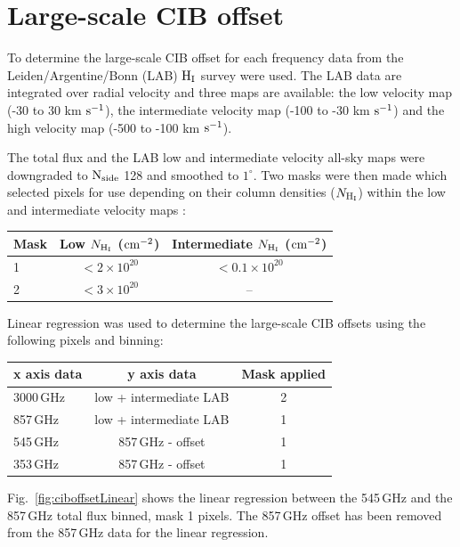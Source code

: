 \documentclass[a4paper,fleqn,usenatbib]{mnras}
\begin{document}


\appendix

\section{Large-scale CIB offset}\label{sec:apA}

To determine the large-scale CIB offset for each frequency data from the Leiden/Argentine/Bonn (LAB) $\rm{H_{I}}$ survey \citep{lab} were used. The LAB data are integrated over radial velocity and three maps are available: the low velocity map (-30 to 30 km $\rm{s}^{-1}$), the intermediate velocity map (-100 to -30 km $\rm{s}^{-1}$) and the high velocity map (-500 to -100 km $\rm{s}^{-1}$). 

The total flux and the LAB low and intermediate velocity all-sky maps were downgraded to $\rm{N_{side}}$ 128 and smoothed to $1^{\circ}$. Two masks were then made which selected pixels for use depending on their column densities ($N_{\rm{H_{I}}}$) within the low and intermediate velocity maps :

\begin{tabular}{ l | c | c  }
\hline
  Mask & Low $N_{\rm{H_{I}}}$ ($\rm{cm}^{-2}$) & Intermediate $N_{\rm{H_{I}}}$ ($\rm{cm}^{-2}$)  \\
  \hline
  1 &  $< 2 \times 10^{20}$  & $ < 0.1 \times 10^{20}$ \\
  2 &  $ < 3 \times 10^{20}$  & -- \\
  \hline
\end{tabular}

Linear regression was used to determine the large-scale CIB offsets using the following pixels and binning: 

\begin{tabular}{ l | c | c  }
\hline
 x axis data & y axis data & Mask applied \\
  \hline
  3000\,GHz & low + intermediate LAB & 2 \\ 
  857\,GHz &  low + intermediate LAB & 1 \\
  545\,GHz & 857\,GHz - offset & 1 \\
  353\,GHz & 857\,GHz - offset & 1 \\
  \hline
\end{tabular}

Fig.~\ref{fig:ciboffsetLinear} shows the linear regression between the 545\,GHz and the 857\,GHz total flux binned, mask 1 pixels. The 857\,GHz offset has been removed from the 857\,GHz data for the linear regression. 
\end{document}
